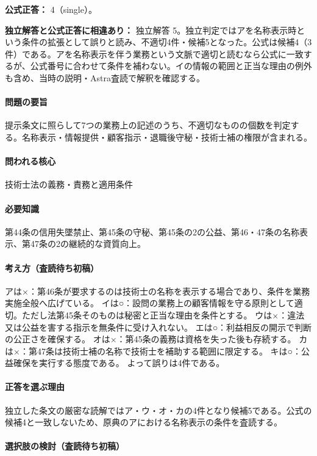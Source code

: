 \textbf{公式正答：} 4（single）。

\par\textbf{独立解答と公式正答に相違あり：} 独立解答 5。独立判定ではアを名称表示時という条件の拡張として誤りと読み、不適切4件・候補5となった。公式は候補4（3件）である。アを名称表示を伴う業務という文脈で適切と読むなら公式に一致するが、公式番号に合わせて条件を補わない。イの情報の範囲と正当な理由の例外も含め、当時の説明・Astra査読で解釈を確認する。

\paragraph{問題の要旨} 提示条文に照らして7つの業務上の記述のうち、不適切なものの個数を判定する。名称表示・情報提供・顧客指示・退職後守秘・技術士補の権限が含まれる。

\paragraph{問われる核心} 技術士法の義務・責務と適用条件

\paragraph{必要知識} 第44条の信用失墜禁止、第45条の守秘、第45条の2の公益、第46・47条の名称表示、第47条の2の継続的な資質向上。

\paragraph{考え方（査読待ち初稿）} アは×：第46条が要求するのは技術士の名称を表示する場合であり、条件を業務実施全般へ広げている。 イは○：設問の業務上の顧客情報を守る原則として適切。ただし法第45条そのものは秘密と正当な理由を条件とする。 ウは×：違法又は公益を害する指示を無条件に受け入れない。 エは○：利益相反の開示で判断の公正さを確保する。 オは×：第45条の義務は資格を失った後も存続する。 カは×：第47条は技術士補の名称で技術士を補助する範囲に限定する。 キは○：公益確保を実行する態度である。 よって誤りは4件である。

\paragraph{正答を選ぶ理由} 独立した条文の厳密な読解ではア・ウ・オ・カの4件となり候補5である。公式の候補4と一致しないため、原典のアにおける名称表示の条件を査読する。

\paragraph{選択肢の検討（査読待ち初稿）}\mbox{}\par

